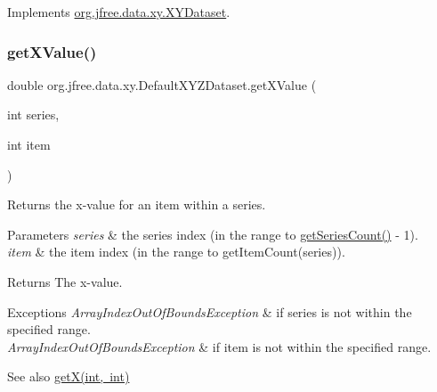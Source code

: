 Implements \mbox{\hyperlink{interfaceorg_1_1jfree_1_1data_1_1xy_1_1_x_y_dataset_a85c75ba5b69b551e96afd29d1732ba22}{org.\+jfree.\+data.\+xy.\+X\+Y\+Dataset}}.

\mbox{\label{classorg_1_1jfree_1_1data_1_1xy_1_1_default_x_y_z_dataset_a595c9b15046e75687ad4cc5f7b6a4617}} 
\subsubsection{\texorpdfstring{get\+X\+Value()}{getXValue()}}
{\footnotesize\ttfamily double org.\+jfree.\+data.\+xy.\+Default\+X\+Y\+Z\+Dataset.\+get\+X\+Value (\begin{DoxyParamCaption}\item[{int}]{series,  }\item[{int}]{item }\end{DoxyParamCaption})}

Returns the x-\/value for an item within a series.


\begin{DoxyParams}{Parameters}
{\em series} & the series index (in the range {} to {\ttfamily \mbox{\hyperlink{classorg_1_1jfree_1_1data_1_1xy_1_1_default_x_y_z_dataset_a115138a06afdc19d3526ef73fabf578e}{get\+Series\+Count()}} -\/ 1}). \\
\hline
{\em item} & the item index (in the range {} to {\ttfamily get\+Item\+Count(series)}).\\
\hline
\end{DoxyParams}
\begin{DoxyReturn}{Returns}
The x-\/value.
\end{DoxyReturn}

\begin{DoxyExceptions}{Exceptions}
{\em Array\+Index\+Out\+Of\+Bounds\+Exception} & if {\ttfamily series} is not within the specified range. \\
\hline
{\em Array\+Index\+Out\+Of\+Bounds\+Exception} & if {\ttfamily item} is not within the specified range.\\
\hline
\end{DoxyExceptions}
\begin{DoxySeeAlso}{See also}
\mbox{\hyperlink{classorg_1_1jfree_1_1data_1_1xy_1_1_default_x_y_z_dataset_a46a17db4f8c6013a1ff779529478c221}{get\+X(int, int)}} 
\end{DoxySeeAlso}


